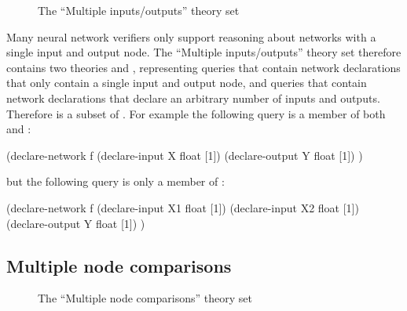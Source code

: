\begin{figure}[h]
\centering
{}
\caption{The ``Multiple inputs/outputs'' theory set}
\label{fig:multiple-inputs-outputs-set}
\end{figure}

Many neural network verifiers only support reasoning about networks with a single input and output node. The ``Multiple inputs/outputs'' theory set therefore contains two theories \sio{} and \mio{}, representing queries that contain network declarations that only contain a single input and output node, and queries that contain network declarations that declare an arbitrary number of inputs and outputs. Therefore \sio{} is a subset of \mio{}. For example the following query is a member of both \sio{} and \mio{}:

\begin{code}[style=lbnf]
(declare-network f
    (declare-input  X float [1])
    (declare-output Y float [1])
)
\end{code}

but the following query is only a member of \mio{}:

\begin{code}[style=lbnf]
(declare-network f
    (declare-input  X1 float [1])
    (declare-input  X2 float [1])
    (declare-output Y  float [1])
)
\end{code}

\subsection{Multiple node comparisons}
\label{sec:multi-node-comparisons}

\begin{figure}[h]
\centering
{}
\caption{The ``Multiple node comparisons'' theory set}
\label{fig:multi-node-comparisons-theory-set}
\end{figure}

